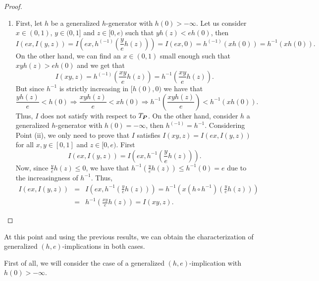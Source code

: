 \begin{proof}
\begin{enumerate}[label=(\roman*)]
		\item First, let $h$ be a generalized $h$-generator with $h(0) > -\infty$. Let us consider $x \in (0,1)$, $y \in (0,1]$ and $z \in [0,e)$ such that $yh(z) < eh(0)$, then
		$$I(ex,I(y,z))=I\left(ex,h^{(-1)}\left(\frac{y}{e}h(z)\right)\right) = I(ex,0)=h^{(-1)}(xh(0))=h^{-1}(xh(0)).$$
		On the other hand, we can find an $x\in(0,1)$ small enough such that $xyh(z)>eh(0)$ and we get that
		$$I(xy,z)=h^{(-1)}\left(\frac{xy}{e}h(z)\right)=h^{-1}\left(\frac{xy}{e}h(z)\right).$$
		But since $h^{-1}$ is strictly increasing in $[h(0),0)$ we have that
		$$\frac{yh(z)}{e} < h(0) \Rightarrow \frac{xyh(z)}{e} <xh(0) \Rightarrow h^{-1}\left(\frac{xyh(z)}{e}\right) < h^{-1}(xh(0)).$$
		Thus, $I$ does not satisfy \LIex with respect to $T_{\bm{P}}$. On the other hand, consider $h$ a generalized $h$-generator with $h(0)=-\infty$, then $h^{(-1)}=h^{-1}$. Considering Point (ii), we only need to prove that $I$ satisfies $I(xy,z)=I(ex,I(y,z))$ for all $x,y\in[0,1]$ and $z \in [0,e)$. First
		$$I(ex,I(y,z))= I\left(ex,h^{-1}\left(\frac{y}{e}h(z)\right)\right).$$
		Now, since $\frac{y}{e}h(z) \leq 0$, we have that $h^{-1}\left(\frac{y}{e}h(z)\right) \leq h^{-1}(0)=e$ due to the increasingness of $h^{-1}$. Thus,
		\begin{eqnarray*}
		I(ex,I(y,z)) &=& I\left(ex,h^{-1}\left(\frac{y}{e}h(z)\right)\right) = h^{-1}\left(x (h \circ h^{-1})\left(\frac{y}{e}h(z)\right)\right)\\
		&=&h^{-1}\left(\frac{xy}{e}h(z)\right)=I(xy,z).
		\end{eqnarray*}
	\end{enumerate}
\end{proof}

At this point and using the previous results, we can obtain the characterization of generalized $(h,e)$-implications in both cases.

First of all, we will consider the case of a generalized $(h,e)$-implication with $h(0) > - \infty$. 

